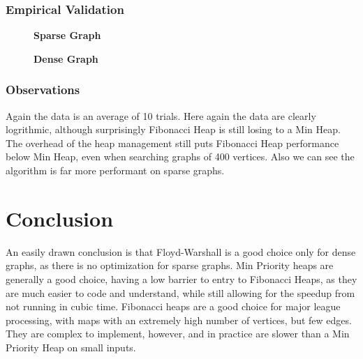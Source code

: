 \documentclass[a4paper,12pt]{article}
\begin{document}
\subsubsection{Empirical Validation}
\begin{figure}[H]
  \centering
  \textbf{Sparse Graph}\par\medskip
\end{figure}
\begin{figure}[H]
  \centering
  \textbf{Dense Graph}\par\medskip
\end{figure}
\subsubsection{Observations}
Again the data is an average of 10 trials. Here again the data are clearly logrithmic, although surprisingly Fibonacci Heap is still losing to a Min Heap. The overhead of the heap management still puts Fibonacci Heap performance below Min Heap, even when searching graphs of 400 vertices. Also we can see the algorithm is far more performant on sparse graphs.
\section{Conclusion}
An easily drawn conclusion is that Floyd-Warshall is a good choice only for dense graphs, as there is no optimization for sparse graphs. Min Priority heaps are generally a good choice, having a low barrier to entry to Fibonacci Heaps, as they are much easier to code and understand, while still allowing for the speedup from not running in cubic time. Fibonacci heaps are a good choice for major league processing, with maps with an extremely high number of vertices, but few edges. They are complex to implement, however, and in practice are slower than a Min Priority Heap on small inputs.
\end{document}
